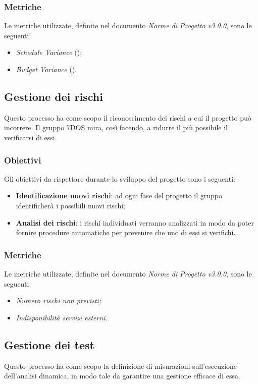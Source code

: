 \subsubsection{Metriche}
Le metriche utilizzate, definite nel documento \emph{Norme di Progetto v3.0.0}, sono le seguenti:
\begin{itemize}
			\item{\emph{Schedule Variance} ();}
			\item{\emph{Budget Variance} ().}
\end{itemize}

\subsection{Gestione dei rischi}
Questo processo ha come scopo il riconoscimento dei rischi a cui il progetto può incorrere. Il gruppo 7DOS mira, così facendo, a ridurre il più possibile il verificarsi di essi.
\subsubsection{Obiettivi} 
Gli obiettivi da rispettare durante lo sviluppo del progetto sono i seguenti:
\begin{itemize}
	\item{\textbf{Identificazione nuovi rischi}: ad ogni fase del progetto il gruppo identificherà i possibili nuovi rischi;}
	\item{\textbf{Analisi dei rischi}: i rischi individuati verranno analizzati in modo da poter fornire procedure automatiche per prevenire che uno di essi si verifichi.}
\end{itemize}
\subsubsection{Metriche}
Le metriche utilizzate, definite nel documento \emph{Norme di Progetto v3.0.0}, sono le seguenti:
\begin{itemize}
	\item\emph{Numero rischi non previsti;}
	\item\emph{Indisponibilità servizi esterni.}
\end{itemize}

\subsection{Gestione dei test}
Questo processo ha come scopo la definizione di misurazioni sull'esecuzione dell'analisi dinamica, in modo tale da garantire una gestione efficace di essa.
